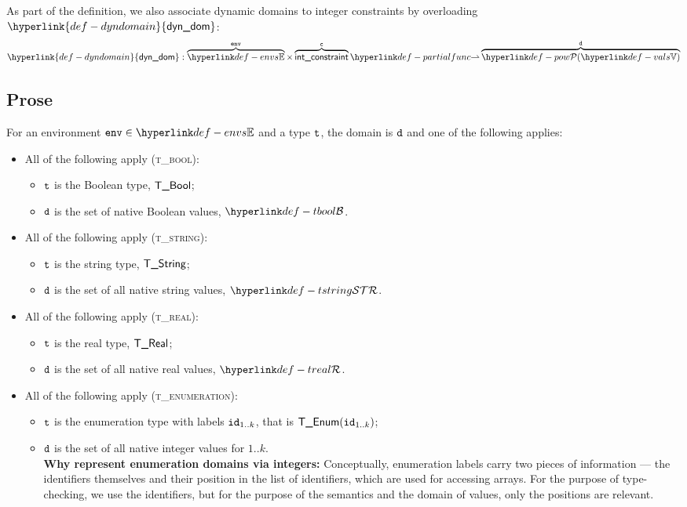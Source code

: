 \documentclass{book}
\newcommand\dynamicdomain[0]{\hyperlink{def-dyndomain}{\textsf{dyn\_dom}}}
\begin{document}
As part of the definition, we also associate dynamic domains to integer constraints
by overloading $\dynamicdomain$:
\[
  \dynamicdomain : \overname{\envs}{\env} \times \overname{\intconstraint}{\vc}
  \partialto \overname{\pow{\vals}}{\vd}
\]

\subsection{Prose}
For an environment $\env \in \envs$ and a type $\texttt{t}$, the domain is $\texttt{d}$ and one of the following applies:
\begin{itemize}
  \item All of the following apply (\textsc{t\_bool}):
  \begin{itemize}
    \item $\texttt{t}$ is the Boolean type, $\textsf{T\_Bool}$;
    \item $\texttt{d}$ is the set of native Boolean values, $\tbool$.
  \end{itemize}

  \item All of the following apply (\textsc{t\_string}):
  \begin{itemize}
    \item $\texttt{t}$ is the string type, $\textsf{T\_String}$;
    \item $\texttt{d}$ is the set of all native string values, $\tstring$.
  \end{itemize}

  \item All of the following apply (\textsc{t\_real}):
  \begin{itemize}
    \item $\texttt{t}$ is the real type, $\textsf{T\_Real}$;
    \item $\texttt{d}$ is the set of all native real values, $\treal$.
  \end{itemize}

  \item All of the following apply (\textsc{t\_enumeration}):
  \begin{itemize}
    \item $\texttt{t}$ is the enumeration type with labels $\texttt{id}_{1..k}$, that is $\textsf{T\_Enum}(\texttt{id}_{1..k})$;
    \item $\texttt{d}$ is the set of all native integer values for $1..k$.\\
    \textbf{Why represent enumeration domains via integers:}
    Conceptually, enumeration labels carry two pieces of information --- the identifiers themselves
    and their position in the list of identifiers, which are used for accessing arrays.
    For the purpose of type-checking, we use the identifiers, but for the purpose of the semantics
    and the domain of values, only the positions are relevant.
  \end{itemize}


\end{itemize}
\end{document}
